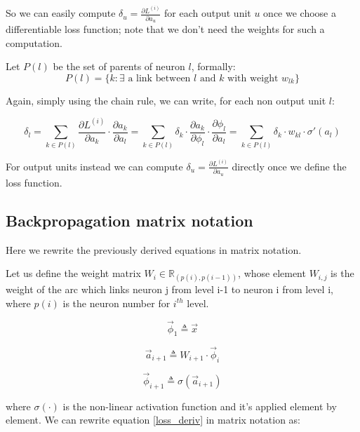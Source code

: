 \documentclass{article}
\begin{document}
So we can easily compute $\delta_u = \frac{\partial L^{(i)}}{\partial a_u} $ for each output unit $u$ once we choose a differentiable loss function; note
that we don't need the weights for such a computation. 

Let $P(l)$ be the set of parents of neuron $l$, formally:
\begin{equation} 
P(l) = \{ k: \exists \text{ a link between $l$ and $k$ with weight } w_{lk} \}
\end{equation}

Again, simply using the chain rule, we can write, for each non output unit $l$:

\begin{equation}
\label{loss_deriv}
\delta_l = \sum_{k\in P(l)} \frac{\partial L^{(i)}}{\partial a_k} \cdot \frac{\partial a_k}{\partial a_l}= \sum_{k\in P(l)} \delta_k \cdot 
\frac{\partial a_k}{\partial \phi_l} \cdot \frac{\partial \phi_l}{\partial a_l} = \sum_{k\in P(l)} \delta_k \cdot 
w_{kl} \cdot \sigma'(a_l)
\end{equation}


For output units instead we can compute $\delta_u = \frac{\partial L^{(i)}}{\partial a_u} $ directly once we define the loss function.

\subsection{Backpropagation matrix notation}

Here we rewrite the previously derived equations in matrix notation.

Let us define the weight matrix $W_i \in \mathbb{R}_{(p(i),p(i-1))}$, whose element $W_{i,j}$ is the weight of the arc which links neuron j from level i-1 to neuron i from level i, where
$p(i)$ is the neuron number for $i^{th}$ level.

\begin{equation}
 \overrightarrow{\phi}_1 \triangleq \overrightarrow{x}
\end{equation}

\begin{equation}
 \overrightarrow{a}_{i+1} \triangleq W_{i+1} \cdot \overrightarrow{\phi}_i
\end{equation}

\begin{equation}
 \overrightarrow{\phi}_{i+1} \triangleq \sigma(\overrightarrow{a}_{i+1})
\end{equation}

where $\sigma(\cdot)$ is the non-linear activation function and it's applied element by element.
We can rewrite equation \ref{loss_deriv} in matrix notation as:

\begin{equation} 
\end{equation}



\newpage
\nocite{*}		 %
{}

\end{document}
